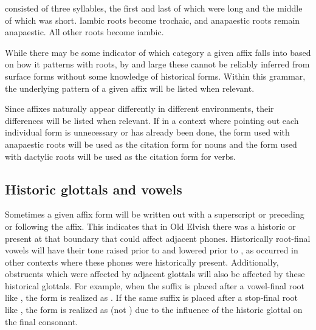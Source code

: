 \documentclass[a4paper,11pt,oneside,openany]{memoir}
\begin{document}
\begin{description}[rightmargin=30pt, labelindent=30pt, labelwidth=0em, leftmargin=!]
\begin{center}
    \end{center}
    \item[Cretic:] consisted of three syllables, the first and last of which were long and the middle of which was short. Iambic roots become trochaic, and anapaestic roots remain anapaestic. All other roots become iambic.
    \begin{center}
    \end{center} 
\end{description}
While there may be some indicator of which category a given affix falls into based on how it patterns with roots, by and large these cannot be reliably inferred from surface forms without some knowledge of historical forms. Within this grammar, the underlying pattern of a given affix will be listed when relevant. 

Since affixes naturally appear differently in different environments, their differences will be listed when relevant. If in a context where pointing out each individual form is unnecessary or has already been done, the form used with anapaestic roots will be used as the citation form for nouns and the form used with dactylic roots will be used as the citation form for verbs.

\subsection{Historic glottals and vowels}

Sometimes a given affix form will be written out with a superscript \supho{} or \supglot{} preceding or following the affix. This indicates that in Old Elvish there was a historic  or \proto{\glotstop} present at that boundary that could affect adjacent phones. Historically root-final vowels will have their tone raised prior to \supglot{} and lowered prior to \suph{}, as occurred in other contexts where these phones were historically present. Additionally, obstruents which were affected by adjacent glottals will also be affected by these historical glottals. For example, when the suffix  is placed after a vowel-final root like , the form is realized as . If the same suffix is placed after a stop-final root like , the form is realized as  (not ) due to the influence of the historic glottal on the final consonant.
\end{document}
